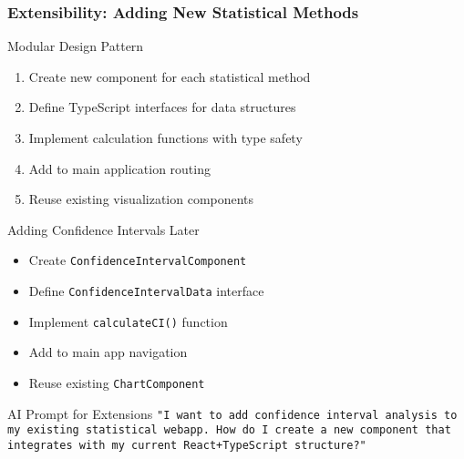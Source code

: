 \documentclass[aspectratio=169]{beamer}
\begin{document}
\begin{frame}
\frametitle{Extensibility: Adding New Statistical Methods}
\begin{alertblock}{Modular Design Pattern}
\begin{enumerate}
\item Create new component for each statistical method
\item Define TypeScript interfaces for data structures
\item Implement calculation functions with type safety
\item Add to main application routing
\item Reuse existing visualization components
\end{enumerate}
\end{alertblock}

\begin{exampleblock}{Adding Confidence Intervals Later}
\begin{itemize}
\item Create \texttt{ConfidenceIntervalComponent}
\item Define \texttt{ConfidenceIntervalData} interface
\item Implement \texttt{calculateCI()} function
\item Add to main app navigation
\item Reuse existing \texttt{ChartComponent}
\end{itemize}
\end{exampleblock}

\begin{alertblock}{AI Prompt for Extensions}
\texttt{"I want to add confidence interval analysis to my existing statistical webapp. How do I create a new component that integrates with my current React+TypeScript structure?"}
\end{alertblock}
\end{frame}
\end{document}

